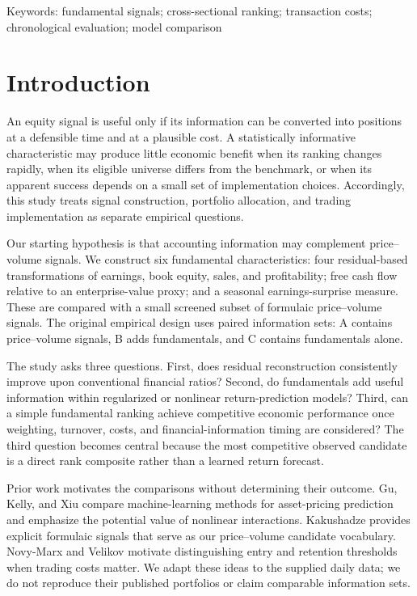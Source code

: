 \documentclass[11pt]{article}
\begin{document}
\vfill
\begin{center}\small Keywords: fundamental signals; cross-sectional ranking; transaction costs; chronological evaluation; model comparison\end{center}
\clearpage
\tableofcontents
\clearpage

\section{Introduction}
An equity signal is useful only if its information can be converted into positions at a defensible time and at a plausible cost. A statistically informative characteristic may produce little economic benefit when its ranking changes rapidly, when its eligible universe differs from the benchmark, or when its apparent success depends on a small set of implementation choices. Accordingly, this study treats signal construction, portfolio allocation, and trading implementation as separate empirical questions.

Our starting hypothesis is that accounting information may complement price--volume signals. We construct six fundamental characteristics: four residual-based transformations of earnings, book equity, sales, and profitability; free cash flow relative to an enterprise-value proxy; and a seasonal earnings-surprise measure. These are compared with a small screened subset of formulaic price--volume signals. The original empirical design uses paired information sets: A contains price--volume signals, B adds fundamentals, and C contains fundamentals alone.

The study asks three questions. First, does residual reconstruction consistently improve upon conventional financial ratios? Second, do fundamentals add useful information within regularized or nonlinear return-prediction models? Third, can a simple fundamental ranking achieve competitive economic performance once weighting, turnover, costs, and financial-information timing are considered? The third question becomes central because the most competitive observed candidate is a direct rank composite rather than a learned return forecast.

Prior work motivates the comparisons without determining their outcome. Gu, Kelly, and Xiu \cite{gkx} compare machine-learning methods for asset-pricing prediction and emphasize the potential value of nonlinear interactions. Kakushadze \cite{wq} provides explicit formulaic signals that serve as our price--volume candidate vocabulary. Novy-Marx and Velikov \cite{nmv} motivate distinguishing entry and retention thresholds when trading costs matter. We adapt these ideas to the supplied daily data; we do not reproduce their published portfolios or claim comparable information sets.
\end{document}
